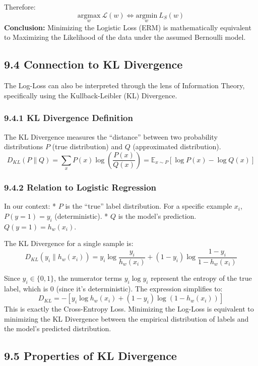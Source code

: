 \documentclass[
  italian,
  11pt,
]{article}
\begin{document}
Therefore:
\[\underset{w}{\text{argmax}} \ \mathcal{L}(w) \iff \underset{w}{\text{argmin}} \ L_S(w)\]
\textbf{Conclusion:} Minimizing the Logistic Loss (ERM) is
mathematically equivalent to Maximizing the Likelihood of the data under
the assumed Bernoulli model.

\subsection{9.4 Connection to KL
Divergence}\label{connection-to-kl-divergence}

The Log-Loss can also be interpreted through the lens of Information
Theory, specifically using the Kullback-Leibler (KL) Divergence.

\subsubsection{9.4.1 KL Divergence
Definition}\label{kl-divergence-definition}

The KL Divergence measures the ``distance'' between two probability
distributions \(P\) (true distribution) and \(Q\) (approximated
distribution).
\[D_{KL}(P \| Q) = \sum_{x} P(x) \log \left( \frac{P(x)}{Q(x)} \right) = \mathbb{E}_{x \sim P} [\log P(x) - \log Q(x)]\]

\subsubsection{9.4.2 Relation to Logistic
Regression}\label{relation-to-logistic-regression}

In our context: * \(P\) is the ``true'' label distribution. For a
specific example \(x_i\), \(P(y=1) = y_i\) (deterministic). * \(Q\) is
the model's prediction. \(Q(y=1) = h_w(x_i)\).

The KL Divergence for a single sample is:
\[D_{KL}(y_i \| h_w(x_i)) = y_i \log \frac{y_i}{h_w(x_i)} + (1-y_i) \log \frac{1-y_i}{1-h_w(x_i)}\]

Since \(y_i \in \{0, 1\}\), the numerator terms \(y_i \log y_i\)
represent the entropy of the true label, which is \(0\) (since it's
deterministic). The expression simplifies to:
\[D_{KL} = - \left[ y_i \log h_w(x_i) + (1-y_i) \log (1-h_w(x_i)) \right]\]
This is exactly the Cross-Entropy Loss. Minimizing the Log-Loss is
equivalent to minimizing the KL Divergence between the empirical
distribution of labels and the model's predicted distribution.

\subsection{9.5 Properties of KL
Divergence}\label{properties-of-kl-divergence}
\end{document}
